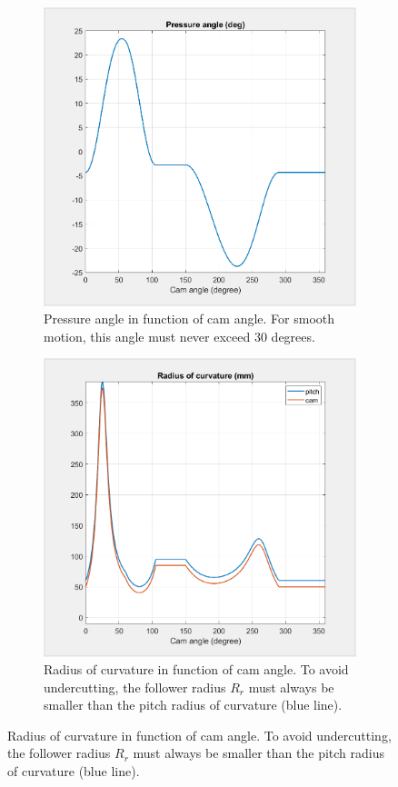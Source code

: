 \documentclass[a4paper]{article}
\begin{document}
\begin{figure}
	\centering
	
	\begin{subfigure}{.7\textwidth}
		\centering
		\includegraphics[width=\textwidth]{presmet.png}
		\caption{Pressure angle in function of cam angle. For smooth motion, this angle must never exceed 30 degrees.}
		\label{fig:presmet}
	\end{subfigure}
	\hfill
	\begin{subfigure}{.7\textwidth}
		\centering
		\includegraphics[width=\textwidth]{radmet.png}
		\caption{Radius of curvature in function of cam angle. To avoid undercutting, the follower radius \(R_r\) must always be smaller than the pitch radius of curvature (blue line).}
		\label{fig:radmet}
	\end{subfigure}
	

\end{figure}
\end{document}
